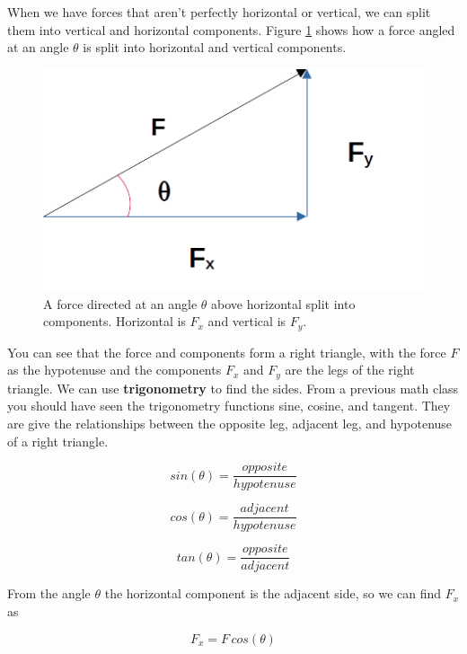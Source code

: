 \documentclass[12pt]{book}
\begin{document}
When we have forces that aren't perfectly horizontal or vertical, we can split them into vertical and horizontal components. Figure \ref{ForceAngle} shows how a force angled at an angle $\theta$ is split into horizontal and vertical components.

\begin{figure}[H]
\centering
\includegraphics[scale=0.6]{Force_Angle.png}
\caption{A force directed at an angle $\theta$ above horizontal split into components. Horizontal is $F_x$ and vertical is $F_y$.}
\label{ForceAngle}
\end{figure}

You can see that the force and components form a right triangle, with the force $F$ as the hypotenuse and the components $F_x$ and $F_y$ are the legs of the right triangle. We can use \textbf{trigonometry} to find the sides. From a previous math class you should have seen the trigonometry functions sine, cosine, and tangent. They are give the relationships between the opposite leg, adjacent leg, and hypotenuse of a right triangle.

\begin{equation}
sin(\theta) = \frac{opposite}{hypotenuse}
\end{equation}

\begin{equation}
cos(\theta) = \frac{adjacent}{hypotenuse}
\end{equation}

\begin{equation}
tan(\theta) = \frac{opposite}{adjacent}
\end{equation}

From the angle $\theta$ the horizontal component is the adjacent side, so we can find $F_x$ as

\begin{equation}
F_x = F \, cos(\theta)
\end{equation}
\end{document}
